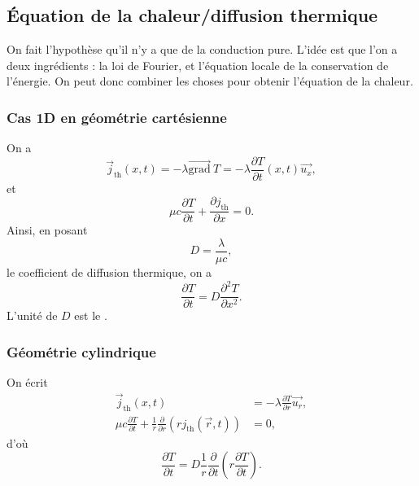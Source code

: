     \subsection{Équation de la chaleur/diffusion thermique}
            
        On fait l'hypothèse qu'il n'y a que de la conduction pure. L'idée est que l'on a deux ingrédients : la loi de Fourier, et l'équation locale de la conservation de l'énergie. On peut donc combiner les choses pour obtenir l'équation de la chaleur.

        \subsubsection{Cas 1D en géométrie cartésienne}
            
            On a 
            \begin{equation}
                \vec{j}_{\text{th}}(x,t)=-\lambda\vec{\mathrm{grad}}~T=-\lambda\frac{\partial T}{\partial t}(x,t)\vec{u_x},
            \end{equation}
            et
            \begin{equation}
                \mu c\frac{\partial T}{\partial t}+\frac{\partial j_{\text{th}}}{\partial x}=0.
            \end{equation}
            Ainsi, en posant
            \begin{equation}
                \boxed{
                    D=\frac{\lambda}{\mu c},
                }
            \end{equation}
            le coefficient de diffusion thermique, on a 
            \begin{equation}
                \boxed{
                    \frac{\partial T}{\partial t}=D\frac{\partial^{2}T}{\partial x^{2}}.
                }
            \end{equation}
            L'unité de $D$ est le \si[]{\metre\square\per\second}.

        \subsubsection{Géométrie cylindrique}
            
            On écrit 
            \begin{equation}
                \begin{aligned}
                    \vec{j}_{\text{th}}(x,t)&=-\lambda\frac{\partial T}{\partial r}\vec{u_r},\\
                    \mu c\frac{\partial T}{\partial t}+\frac{1}{r}\frac{\partial}{\partial r}\left(rj_{\text{th}}(\vec{r},t)\right)&=0,
                \end{aligned}
            \end{equation}
            d'où
            \begin{equation}
                \boxed{
                    \frac{\partial T}{\partial t}=D\frac{1}{r}\frac{\partial}{\partial t}\left(r\frac{\partial T}{\partial t}\right).
                }
            \end{equation}

